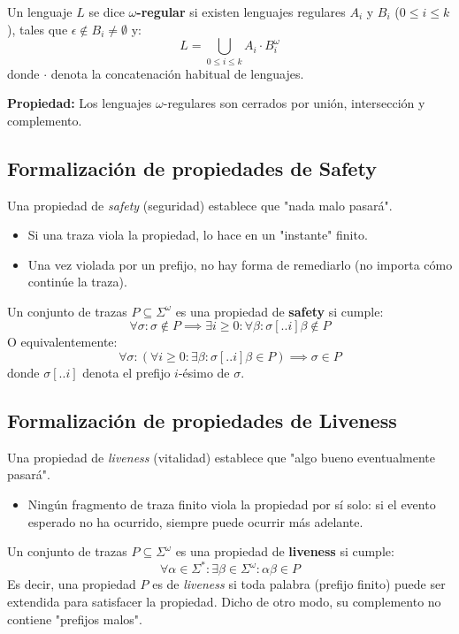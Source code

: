 \documentclass[11pt,a4paper]{article}
\begin{document}
Un lenguaje $L$ se dice \textbf{$\omega$-regular} si existen lenguajes regulares $A_i$ y $B_i$ ($0 \leq i \leq k$), tales que $\epsilon \notin B_i \neq \emptyset$ y:
\[ L = \bigcup_{0 \leq i \leq k} A_i \cdot B_i^\omega \]
donde $\cdot$ denota la concatenación habitual de lenguajes.

\textbf{Propiedad:} Los lenguajes $\omega$-regulares son cerrados por unión, intersección y complemento.

\subsection{Formalización de propiedades de Safety}
Una propiedad de \textit{safety} (seguridad) establece que "nada malo pasará". 
\begin{itemize}
    \item Si una traza viola la propiedad, lo hace en un "instante" finito.
    \item Una vez violada por un prefijo, no hay forma de remediarlo (no importa cómo continúe la traza).
\end{itemize}

Un conjunto de trazas $P \subseteq \Sigma^\omega$ es una propiedad de \textbf{safety} si cumple:
\[ \forall \sigma : \sigma \notin P \implies \exists i \geq 0 : \forall \beta : \sigma[..i]\beta \notin P \]
O equivalentemente:
\[ \forall \sigma : (\forall i \geq 0 : \exists \beta : \sigma[..i]\beta \in P) \implies \sigma \in P \]
donde $\sigma[..i]$ denota el prefijo $i$-ésimo de $\sigma$.

\subsection{Formalización de propiedades de Liveness}
Una propiedad de \textit{liveness} (vitalidad) establece que "algo bueno eventualmente pasará".
\begin{itemize}
    \item Ningún fragmento de traza finito viola la propiedad por sí solo: si el evento esperado no ha ocurrido, siempre puede ocurrir más adelante.
\end{itemize}

Un conjunto de trazas $P \subseteq \Sigma^\omega$ es una propiedad de \textbf{liveness} si cumple:
\[ \forall \alpha \in \Sigma^* : \exists \beta \in \Sigma^\omega : \alpha\beta \in P \]
Es decir, una propiedad $P$ es de \textit{liveness} si toda palabra (prefijo finito) puede ser extendida para satisfacer la propiedad. Dicho de otro modo, su complemento no contiene "prefijos malos".
\end{document}
